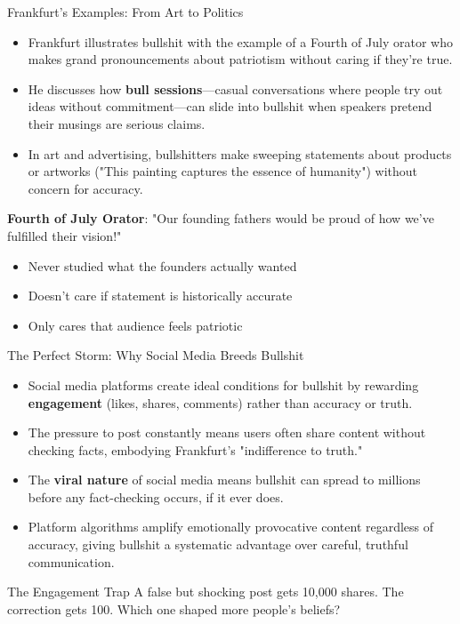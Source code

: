 \documentclass{beamer}
\begin{document}
	\begin{frame}{Frankfurt's Examples: From Art to Politics}
		\begin{itemize}
			\item Frankfurt illustrates bullshit with the example of a Fourth of July orator who makes grand pronouncements about patriotism without caring if they're true.
			\item He discusses how \textbf{bull sessions}—casual conversations where people try out ideas without commitment—can slide into bullshit when speakers pretend their musings are serious claims.
			\item In art and advertising, bullshitters make sweeping statements about products or artworks ("This painting captures the essence of humanity") without concern for accuracy.
		\end{itemize}
		
		\begin{example}
			\scriptsize
			\textbf{Fourth of July Orator}: "Our founding fathers would be proud of how we've fulfilled their vision!"
			\begin{itemize}
				\item Never studied what the founders actually wanted
				\item Doesn't care if statement is historically accurate  
				\item Only cares that audience feels patriotic
			\end{itemize}
		\end{example}
	\end{frame}
	

	\begin{frame}{The Perfect Storm: Why Social Media Breeds Bullshit}
		\begin{itemize}
			\item Social media platforms create ideal conditions for bullshit by rewarding \textbf{engagement} (likes, shares, comments) rather than accuracy or truth.
			\item The pressure to post constantly means users often share content without checking facts, embodying Frankfurt's "indifference to truth."
			\item The \textbf{viral nature} of social media means bullshit can spread to millions before any fact-checking occurs, if it ever does.
			\item Platform algorithms amplify emotionally provocative content regardless of accuracy, giving bullshit a systematic advantage over careful, truthful communication.
		\end{itemize}
		
		\begin{alertblock}{The Engagement Trap}
			A false but shocking post gets 10,000 shares. The correction gets 100. Which one shaped more people's beliefs?
		\end{alertblock}
	\end{frame}
	
\end{document}
